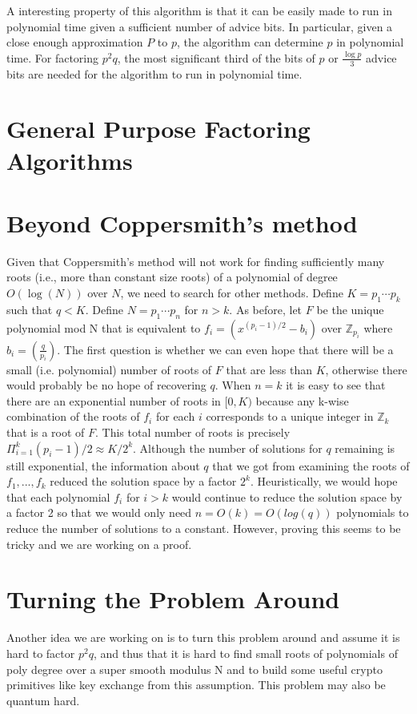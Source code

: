 \documentclass[letterpaper,twocolumn,10pt]{article}
\begin{document}
A interesting property of this algorithm is that it can be easily made to run in polynomial time given a sufficient number of advice bits. In particular, given a close enough approximation $P$ to $p$, the algorithm can determine $p$ in polynomial time. For factoring $p^2 q$, the most significant third of the bits of $p$ or $\frac{\log p}{3}$ advice bits are needed for the algorithm to run in polynomial time.

\section{General Purpose Factoring Algorithms}



\section{Beyond Coppersmith's method} 
Given that Coppersmith's method will not work for finding sufficiently many roots (i.e., more than constant size roots) of a polynomial of degree $O(\log(N))$ over $N$, we need to search for other methods. Define $K = p_1 \cdots p_k$ such that $q < K$. Define $N = p_1 \cdots p_n$ for $n > k$. As before, let $F$ be the unique polynomial mod N that is equivalent to $f_i = (x^{(p_i - 1)/2} - b_i)$ over $\mathbb{Z}_{p_i}$ where $b_i =  \left(\frac{q}{p_i}\right)$. The first question is whether we can even hope that there will be a small (i.e. polynomial) number of roots of $F$ that are less than $K$, otherwise there would probably be no hope of recovering $q$. When $n = k$ it is easy to see that there are an exponential number of roots in $[0, K)$ because any k-wise combination of the roots of $f_i$ for each $i$ corresponds to a unique integer in $\mathbb{Z}_k$ that is a root of $F$. This total number of roots is precisely $\Pi_{i= 1}^k (p_i - 1)/2 \approx K/2^k$. Although the number of solutions for $q$ remaining is still exponential, the information about $q$ that we got from examining the roots of $f_1,...,f_k$ reduced the solution space by a factor $2^k$. Heuristically, we would hope that each polynomial $f_i$ for $i > k$ would continue to reduce the solution space by a factor 2 so that we would only need $n = O(k) = O(log(q))$ polynomials to reduce the number of solutions to a constant. However, proving this seems to be tricky and we are working on a proof. 

\section{Turning the Problem Around} 
Another idea we are working on is to turn this problem around and assume it is hard to factor $p^2q$, and thus that it is hard to find small roots of polynomials of poly degree over a super smooth modulus N and to build some useful crypto primitives like key exchange from this assumption. This problem may also be quantum hard. 
\end{document}
